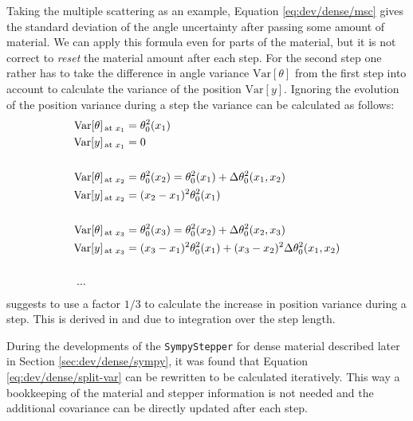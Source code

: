 Taking the multiple scattering as an example, Equation \ref{eq:dev/dense/msc} gives the standard deviation of the angle uncertainty after passing some amount of material. We can apply this formula even for parts of the material, but it is not correct to \textit{reset} the material amount after each step. For the second step one rather has to take the difference in angle variance $\text{Var}[\theta]$ from the first step into account to calculate the variance of the position $\text{Var}[y]$. Ignoring the evolution of the position variance during a step the variance can be calculated as follows:
\begin{equation}
\begin{split}
    \text{Var}[\theta]_\text{\,at $x_1$} &= \theta_0^2(x_1) \\
    \text{Var}[y]_\text{\,at $x_1$} &= 0 \\
    \\
    \text{Var}[\theta]_\text{\,at $x_2$} &= \theta_0^2(x_2) = \theta_0^2(x_1) + \Delta\theta_0^2(x_1,x_2) \\
    \text{Var}[y]_\text{\,at $x_2$} &= (x_2 - x_1)^2 \theta_0^2(x_1) \\
    \\
    \text{Var}[\theta]_\text{\,at $x_3$} &= \theta_0^2(x_3) = \theta_0^2(x_2) + \Delta\theta_0^2(x_2,x_3) \\
    \text{Var}[y]_\text{\,at $x_3$} &= (x_3 - x_1)^2 \theta_0^2(x_1) + (x_3 - x_2)^2 \Delta\theta_0^2(x_1,x_2) \\
    \\
    \text{...} \quad\quad\quad\;\; &
\end{split}
\label{eq:dev/dense/split-var}
\end{equation}
\textcite{pdg2024} suggests to use a factor $1/3$ to calculate the increase in position variance during a step. This is derived in \textcite{cern-81-06} and due to integration over the step length.

During the developments of the \texttt{SympyStepper} for dense material described later in Section \ref{sec:dev/dense/sympy}, it was found that Equation \ref{eq:dev/dense/split-var} can be rewritten to be calculated iteratively. This way a bookkeeping of the material and stepper information is not needed and the additional covariance can be directly updated after each step.

